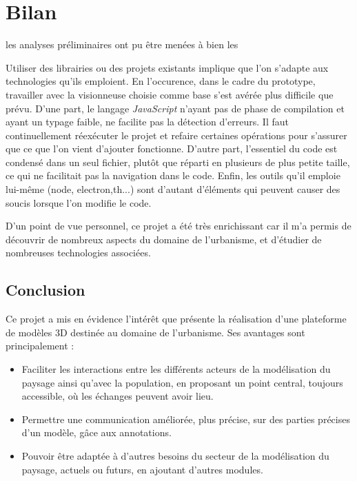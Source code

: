 \chapter{Bilan}
\label{Chapter4}





les analyses préliminaires ont pu être menées à bien
les 

Utiliser des librairies ou des projets existants implique que l'on s'adapte aux technologies qu'ils emploient. En l'occurence, dans le cadre du prototype, travailler avec la visionneuse choisie comme base s'est avérée plus difficile que prévu. D'une part, le langage \textit{JavaScript} n'ayant pas de phase de compilation et ayant un typage faible, ne facilite pas la détection d'erreurs. Il faut continuellement réexécuter le projet et refaire certaines opérations pour s'assurer que ce que l'on vient d'ajouter fonctionne. D'autre part, l'essentiel du code est condensé dans un seul fichier, plutôt que réparti en plusieurs de plus petite taille, ce qui ne facilitait pas la navigation dans le code. Enfin, les outils qu'il emploie lui-même (node, electron,th...) sont d'autant d'éléments qui peuvent causer des soucis lorsque l'on modifie le code.



D'un point de vue personnel, ce projet a été très enrichissant car il m'a permis de découvrir de nombreux aspects du domaine de l'urbanisme, et d'étudier de nombreuses technologies associées.

\section{Conclusion}
Ce projet a mis en évidence l'intérêt que présente la réalisation d'une plateforme de modèles 3D destinée au domaine de l'urbanisme. Ses avantages sont principalement :

\begin{itemize}
    \item Faciliter les interactions entre les différents acteurs de la modélisation du paysage ainsi qu'avec la population, en proposant un point central, toujours accessible, où les échanges peuvent avoir lieu.
    \item Permettre une communication améliorée, plus précise, sur des parties précises d'un modèle, gâce aux annotations.
    \item Pouvoir être adaptée à d'autres besoins du secteur de la modélisation du paysage, actuels ou futurs, en ajoutant d'autres modules.
\end{itemize}

